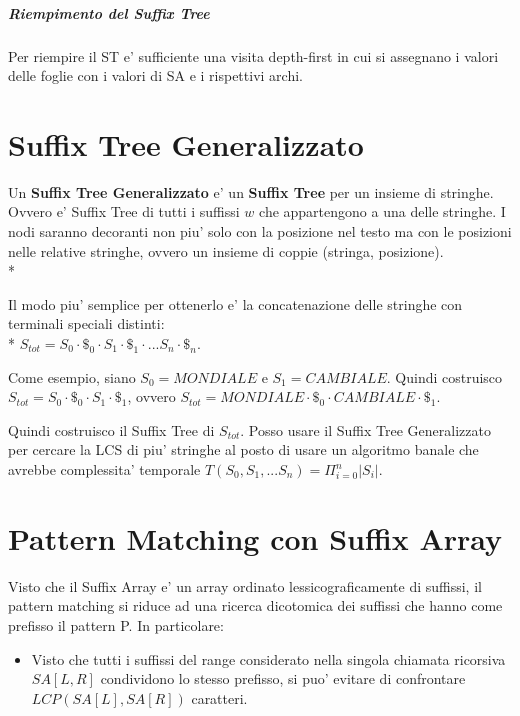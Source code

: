 \subparagraph{Riempimento del Suffix Tree}

Per riempire il ST e' sufficiente una visita depth-first in cui si assegnano i valori delle foglie con i valori di SA e i rispettivi archi.

\section{Suffix Tree Generalizzato}

Un \textbf{Suffix Tree Generalizzato} e' un \textbf{Suffix Tree} per un insieme di stringhe.
Ovvero e' Suffix Tree di tutti i suffissi $w$ che appartengono a una delle stringhe.
I nodi saranno decoranti non piu' solo con la posizione nel testo ma con le posizioni nelle relative stringhe, ovvero un insieme di coppie (stringa, posizione). \\*

Il modo piu' semplice per ottenerlo e' la concatenazione delle stringhe con terminali speciali distinti: \\*
$S_{tot} = S_0 \cdot \$_0 \cdot S_1 \cdot \$_1 \cdot ... S_n \cdot \$_n$.

Come esempio, siano $S_0 = MONDIALE$ e $S_1 = CAMBIALE$.
Quindi costruisco $S_{tot} = S_0 \cdot \$_0 \cdot S_1 \cdot \$_1$, ovvero $S_{tot} = MONDIALE \cdot \$_0 \cdot CAMBIALE \cdot \$_1$.

Quindi costruisco il Suffix Tree di $S_{tot}$.
Posso usare il Suffix Tree Generalizzato per cercare la LCS di piu' stringhe al posto di usare un algoritmo banale che avrebbe complessita' temporale $T(S_0,S_1, ... S_n) = \Pi _ {i=0} ^ {n} |S_i|$.

\section{Pattern Matching con Suffix Array}

Visto che il Suffix Array e' un array ordinato lessicograficamente di suffissi, il pattern matching si riduce ad una ricerca dicotomica dei suffissi che hanno come prefisso il pattern P.
In particolare:

\begin{itemize}
    \item Visto che tutti i suffissi del range considerato nella singola chiamata ricorsiva $SA[L, R]$ condividono lo stesso prefisso, si puo' evitare di confrontare $LCP(SA[L], SA[R])$ caratteri.

\end{itemize}

